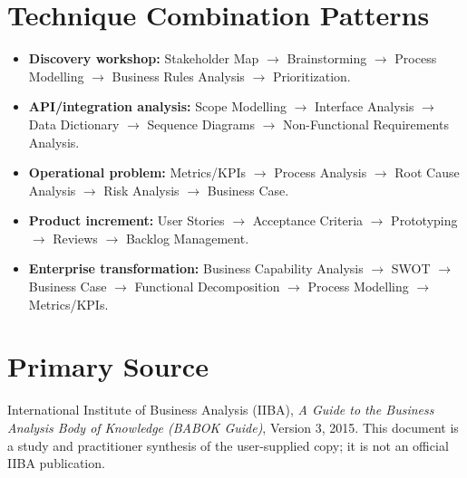 \documentclass[11pt]{article}
\begin{document}
\section{Technique Combination Patterns}
\begin{itemize}
\item \textbf{Discovery workshop:} Stakeholder Map $\rightarrow$ Brainstorming $\rightarrow$ Process Modelling $\rightarrow$ Business Rules Analysis $\rightarrow$ Prioritization.
\item \textbf{API/integration analysis:} Scope Modelling $\rightarrow$ Interface Analysis $\rightarrow$ Data Dictionary $\rightarrow$ Sequence Diagrams $\rightarrow$ Non-Functional Requirements Analysis.
\item \textbf{Operational problem:} Metrics/KPIs $\rightarrow$ Process Analysis $\rightarrow$ Root Cause Analysis $\rightarrow$ Risk Analysis $\rightarrow$ Business Case.
\item \textbf{Product increment:} User Stories $\rightarrow$ Acceptance Criteria $\rightarrow$ Prototyping $\rightarrow$ Reviews $\rightarrow$ Backlog Management.
\item \textbf{Enterprise transformation:} Business Capability Analysis $\rightarrow$ SWOT $\rightarrow$ Business Case $\rightarrow$ Functional Decomposition $\rightarrow$ Process Modelling $\rightarrow$ Metrics/KPIs.
\end{itemize}

\section*{Primary Source}
International Institute of Business Analysis (IIBA), \emph{A Guide to the Business Analysis Body of Knowledge (BABOK Guide)}, Version 3, 2015. This document is a study and practitioner synthesis of the user-supplied copy; it is not an official IIBA publication.
\end{document}
